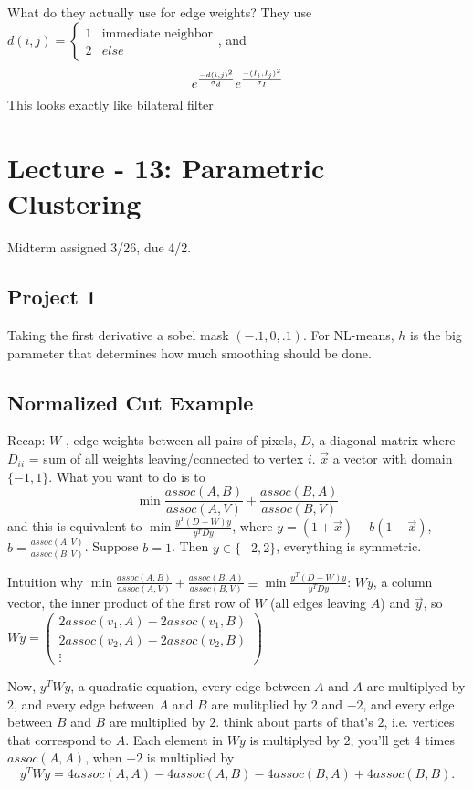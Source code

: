 What do they actually use for edge weights? They use $d(i,j)=
\begin{cases}
  1 & \text{immediate neighbor}\\
  2 & else
\end{cases}$, and 
$$e^{\frac{-d(i,j)^2}{\sigma_d}} e^{\frac{-(I_i, I_j)^2}{\sigma_I}}$$ This
  looks exactly like bilateral filter

\pagebreak

\section{Lecture - 13: Parametric Clustering}
\label{sec:lecture-13}
Midterm assigned 3/26, due 4/2.
\subsection{Project 1}
Taking the first derivative a sobel mask $(-.1, 0, .1)$.
For NL-means, $h$ is the big parameter that determines how much
smoothing should be done. 
\subsection{Normalized Cut Example}
Recap: $W$ , edge weights between all pairs of pixels, $D$, a diagonal
matrix where $D_{ii}$ = sum of all weights leaving/connected to vertex
$i$. $\vec x$ a vector with domain $\{-1, 1\}$.
What you want to do is to $$\min \frac{ assoc(A,B)}{assoc(A,V)} +
\frac{ assoc(B,A)}{assoc(B,V)}$$ and this is equivalent to  $\min
\frac{y^T(D-W)y}{y^TDy}$, where $y=(1+\vec x) - b(1-\vec x)$, $b =
\frac{ assoc(A,V)}{assoc(B,V)}$.
Suppose $b=1$. Then $y\in \{-2, 2\}$, everything is symmetric. 

Intuition why $\min \frac{ assoc(A,B)}{assoc(A,V)} +
\frac{ assoc(B,A)}{assoc(B,V)} \equiv \min
\frac{y^T(D-W)y}{y^TDy}$:
$Wy$,  a column vector, the inner product of the first row of $W$ (all
edges leaving $A$) and $\vec y$, so $Wy =
\begin{pmatrix}
  2assoc(v_1, A) - 2assoc(v_1, B) \\
  2assoc(v_2, A) - 2assoc(v_2, B) \\
\vdots
\end{pmatrix}$

Now, $y^TWy$, a quadratic equation, every edge between $A$ and $A$ are
multiplyed by $2$, and every edge between $A$ and $B$ are mulitplied
by $2$ and $-2$, and every edge between $B$ and $B$ are multiplied by
$2$. think about parts of  that's $2$, i.e. vertices that
correspond to $A$. Each element in $Wy$ is multiplyed by $2$, you'll
get 4 times $assoc(A,A)$, when $-2$ is multiplied by 
$$y^TWy = 4 assoc(A,A) -4assoc(A,B)  - 4assoc(B,A) + 4assoc(B,B).$$


